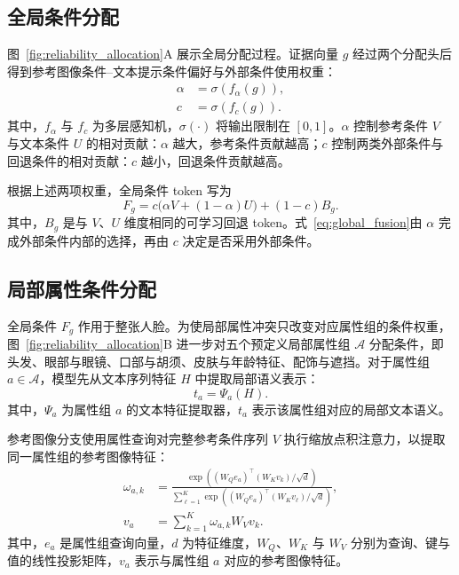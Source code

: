 \documentclass[journal]{IEEEtran}
\begin{document}
\subsection{全局条件分配}
图~\ref{fig:reliability_allocation}A 展示全局分配过程。证据向量 $g$ 经过两个分配头后得到参考图像条件--文本提示条件偏好与外部条件使用权重：
\begin{subequations}
\label{eq:global_weights}
\begin{align}
\alpha&=\sigma\!\left(f_{\alpha}(g)\right),\\
c&=\sigma\!\left(f_{c}(g)\right).
\end{align}
\end{subequations}
其中，$f_{\alpha}$ 与 $f_c$ 为多层感知机，$\sigma(\cdot)$ 将输出限制在 $[0,1]$。$\alpha$ 控制参考条件 $V$ 与文本条件 $U$ 的相对贡献：$\alpha$ 越大，参考条件贡献越高；$c$ 控制两类外部条件与回退条件的相对贡献：$c$ 越小，回退条件贡献越高。

根据上述两项权重，全局条件 token 写为
\begin{equation}
\label{eq:global_fusion}
F_g=
c\Big(\alpha V+(1-\alpha)U\Big)
+(1-c)B_g.
\end{equation}
其中，$B_g$ 是与 $V$、$U$ 维度相同的可学习回退 token。式~\eqref{eq:global_fusion}由 $\alpha$ 完成外部条件内部的选择，再由 $c$ 决定是否采用外部条件。

\subsection{局部属性条件分配}
全局条件 $F_g$ 作用于整张人脸。为使局部属性冲突只改变对应属性组的条件权重，图~\ref{fig:reliability_allocation}B 进一步对五个预定义局部属性组 $\mathcal{A}$ 分配条件，即头发、眼部与眼镜、口部与胡须、皮肤与年龄特征、配饰与遮挡。对于属性组 $a\in\mathcal{A}$，模型先从文本序列特征 $H$ 中提取局部语义表示：
\begin{equation}
\label{eq:slot_text_feature}
t_a=\Psi_a(H).
\end{equation}
其中，$\Psi_a$ 为属性组 $a$ 的文本特征提取器，$t_a$ 表示该属性组对应的局部文本语义。

参考图像分支使用属性查询对完整参考条件序列 $V$ 执行缩放点积注意力，以提取同一属性组的参考图像特征\cite{vaswani2017attention}：
\begin{subequations}
\label{eq:slot_attention}
\begin{align}
\omega_{a,k}
&=
\frac{
\exp\!\left((W_Q e_a)^{\top}(W_K v_k)/\sqrt{d}\right)
}{
\sum_{\ell=1}^{K}
\exp\!\left((W_Q e_a)^{\top}(W_K v_{\ell})/\sqrt{d}\right)
},\\
v_a
&=
\sum_{k=1}^{K}\omega_{a,k}W_V v_k.
\end{align}
\end{subequations}
其中，$e_a$ 是属性组查询向量，$d$ 为特征维度，$W_Q$、$W_K$ 与 $W_V$ 分别为查询、键与值的线性投影矩阵，$v_a$ 表示与属性组 $a$ 对应的参考图像特征。
\end{document}
